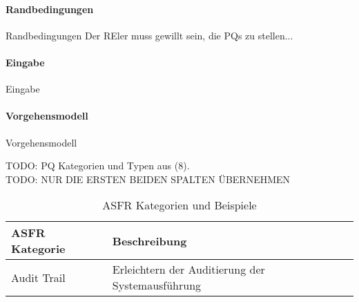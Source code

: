 \paragraph{Randbedingungen}

Randbedingungen
Der REler muss gewillt sein, die PQs zu stellen...\\

\paragraph{Eingabe}

Eingabe


\paragraph{Vorgehensmodell}

Vorgehensmodell


TODO: PQ Kategorien und Typen aus (8). \\


TODO: NUR DIE ERSTEN BEIDEN SPALTEN ÜBERNEHMEN

\begin{table}[h] %
\caption{ASFR Kategorien und Beispiele}
\centering
\begin{tabular}{|p{3cm}|p{5cm}|}
	\hline
	\textbf{ASFR Kategorie} & \textbf{Beschreibung} \\ %
	\hline
  	Audit Trail & Erleichtern der Auditierung der Systemausführung \\%
	\hline
\end{tabular}
\label{tab:asfr_category_table}
\end{table}


